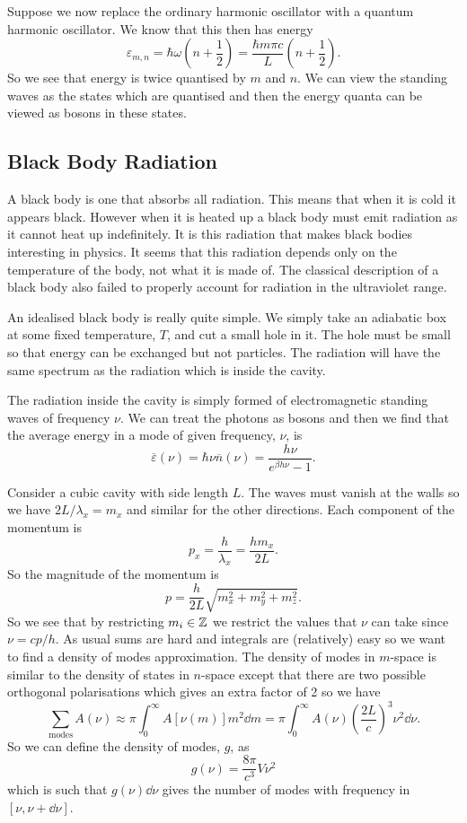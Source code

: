 \documentclass[a4paper]{article}
\newcommand{\mean}[1]{\overline{#1}}
\begin{document}
    Suppose we now replace the ordinary harmonic oscillator with a quantum harmonic oscillator.
    We know that this then has energy
    \[\varepsilon_{m,n} = \hbar\omega\left( n + \frac{1}{2} \right) = \frac{\hbar m\pi c}{L}\left( n + \frac{1}{2} \right).\]
    So we see that energy is twice quantised by \(m\) and \(n\).
    We can view the standing waves as the states which are quantised and then the energy quanta can be viewed as bosons in these states.
    
    \subsection{Black Body Radiation}
    A black body is one that absorbs all radiation.
    This means that when it is cold it appears black.
    However when it is heated up a black body must emit radiation as it cannot heat up indefinitely.
    It is this radiation that makes black bodies interesting in physics.
    It seems that this radiation depends only on the temperature of the body, not what it is made of.
    The classical description of a black body also failed to properly account for radiation in the ultraviolet range.
    
    An idealised black body is really quite simple.
    We simply take an adiabatic box at some fixed temperature, \(T\), and cut a small hole in it.
    The hole must be small so that energy can be exchanged but not particles.
    The radiation will have the same spectrum as the radiation which is inside the cavity.
    
    The radiation inside the cavity is simply formed of electromagnetic standing waves of frequency \(\nu\).
    We can treat the photons as bosons and then we find that the average energy in a mode of given frequency, \(\nu\), is
    \[\mean{\varepsilon}(\nu) = \hbar \nu \mean{n}(\nu) = \frac{h\nu}{e^{\beta h\nu} - 1}.\]
    
    Consider a cubic cavity with side length \(L\).
    The waves must vanish at the walls so we have \(2L/\lambda_x = m_{x}\) and similar for the other directions.
    Each component of the momentum is
    \[p_x = \frac{h}{\lambda_x} = \frac{hm_x}{2L}.\]
    So the magnitude of the momentum is
    \[p = \frac{h}{2L}\sqrt{m_x^2 + m_y^2 + m_z^2}.\]
    So we see that by restricting \(m_i\in\mathbb{Z}\) we restrict the values that \(\nu\) can take since \(\nu = cp/h\).
    As usual sums are hard and integrals are (relatively) easy so we want to find a density of modes approximation.
    The density of modes in \(m\)-space is similar to the density of states in \(n\)-space except that there are two possible orthogonal polarisations which gives an extra factor of 2 so we have
    \[\sum_{\text{modes}} A(\nu) \approx \pi\int_{0}^{\infty} A[\nu(m)] m^2 \dd{m} = \pi\int_{0}^{\infty} A(\nu)\left( \frac{2L}{c} \right)^3\nu^2\dd{\nu}.\]
    So we can define the density of modes, \(g\), as
    \[g(\nu) = \frac{8\pi}{c^3}V\nu^2\]
    which is such that \(g(\nu)\dd{\nu}\) gives the number of modes with frequency in \([\nu, \nu + \dd{\nu}]\).
    
\end{document}
